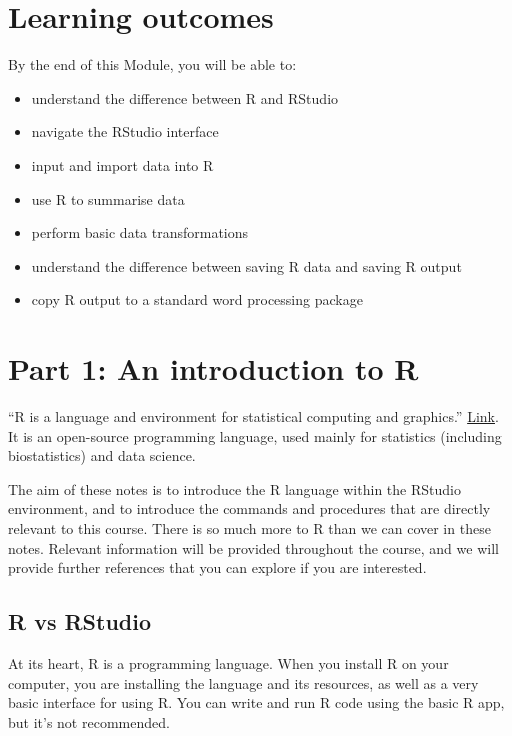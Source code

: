 \documentclass[
  a4paper,
]{memoir}
\providecommand{\tightlist}{%
  \setlength{\itemsep}{0pt}\setlength{\parskip}{0pt}}
\begin{document}

\section*{Learning outcomes}\label{learning-outcomes-2}


By the end of this Module, you will be able to:

\begin{itemize}
\tightlist
\item
  understand the difference between R and RStudio
\item
  navigate the RStudio interface
\item
  input and import data into R
\item
  use R to summarise data
\item
  perform basic data transformations
\item
  understand the difference between saving R data and saving R output
\item
  copy R output to a standard word processing package
\end{itemize}

\section{Part 1: An introduction to
R}\label{part-1-an-introduction-to-r}

``R is a language and environment for statistical computing and
graphics.'' \href{https://www.r-project.org/about.html}{Link}. It is an
open-source programming language, used mainly for statistics (including
biostatistics) and data science.

The aim of these notes is to introduce the R language within the RStudio
environment, and to introduce the commands and procedures that are
directly relevant to this course. There is so much more to R than we can
cover in these notes. Relevant information will be provided throughout
the course, and we will provide further references that you can explore
if you are interested.

\subsection{R vs RStudio}\label{r-vs-rstudio}

At its heart, R is a programming language. When you install R on your
computer, you are installing the language and its resources, as well as
a very basic interface for using R. You can write and run R code using
the basic R app, but it's not recommended.
\end{document}
